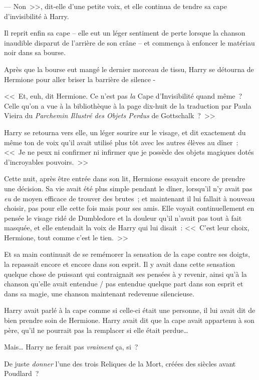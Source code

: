 --- Non~>>, dit-elle d'une petite voix, et elle continua de tendre sa cape d'invisibilité à Harry.

Il reprit enfin sa cape -- elle eut un léger sentiment de perte lorsque la chanson inaudible disparut de l'arrière de son crâne -- et commença à enfoncer le matériau noir dans sa bourse.

Après que la bourse eut mangé le dernier morceau de tissu, Harry se détourna de Hermione pour aller briser la barrière de silence -

<<~Et, euh, dit Hermione. Ce n'est pas \emph{la} Cape d'Invisibilité quand même~? Celle qu'on a vue à la bibliothèque à la page dix-huit de la traduction par Paula Vieira du \emph{Parchemin Illustré des Objets Perdus} de Gottschalk~?~>>

Harry se retourna vers elle, un léger sourire sur le visage, et dit exactement du même ton de voix qu'il avait utilisé plus tôt avec les autres élèves au dîner~: <<~Je ne peux ni confirmer ni infirmer que je possède des objets magiques dotés d'incroyables pouvoirs.~>>

\later

Cette nuit, après être entrée dans son lit, Hermione essayait encore de prendre une décision. Sa vie avait été plus simple pendant le dîner, lorsqu'il n'y avait pas \emph{eu} de moyen efficace de trouver des brutes~; et maintenant il lui fallait à nouveau choisir, pas pour elle cette fois mais pour ses amis. Elle voyait continuellement en pensée le visage ridé de Dumbledore et la douleur qu'il n'avait pas tout à fait masquée, et elle entendait la voix de Harry qui lui disait~: <<~C'est leur choix, Hermione, tout comme c'est le tien.~>>

Et sa main continuait de se remémorer la sensation de la cape contre ses doigts, la repassait encore et encore dans son esprit. Il y avait dans cette sensation quelque chose de puissant qui contraignait ses pensées à y revenir, ainsi qu'à la chanson qu'elle avait entendue / pas entendue quelque part dans son esprit et dans sa magie, une chanson maintenant redevenue silencieuse.

Harry avait parlé à la cape comme si celle-ci était une personne, il lui avait dit de bien prendre soin de Hermione. Harry avait dit que la cape avait appartenu à son père, qu'il ne pourrait pas la remplacer si elle était perdue…

Mais… Harry ne ferait pas \emph{vraiment} ça, si~?

De juste \emph{donner} l'une des trois Reliques de la Mort, créées des siècles avant Poudlard~?

